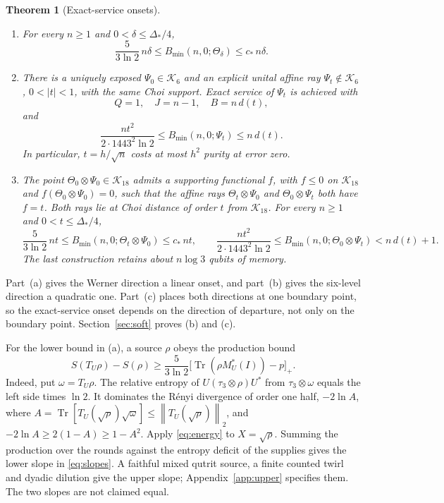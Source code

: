 \documentclass[11pt]{article}
\newtheorem{theorem}{Theorem}
\theoremstyle{definition}
\theoremstyle{remark}
\DeclareMathOperator{\Tr}{Tr}
\newcommand{\K}{\mathcal K}
\newcommand{\norm}[1]{\left\lVert#1\right\rVert}
\begin{document}
\begin{theorem}[Exact-service onsets]\label{thm:onsets}
\begin{enumerate}[label=(\alph*),itemsep=4pt]
\item For every $n\ge1$ and $0<\delta\le\Delta_*/4$,
\begin{equation}\label{eq:slopes}
 \frac{5}{3\ln2}\,n\delta\le B_{\min}(n,0;\Theta_\delta)\le c_*\,n\delta.
\end{equation}
\item There is a uniquely exposed $\Psi_0\in\K_6$ and an explicit unital affine ray $\Psi_t\notin\K_6$, $0<|t|<1$, with the same Choi support. Exact service of $\Psi_t$ is achieved with
\begin{equation}\label{eq:soft-ledger}
 Q=1,\quad J=n-1,\quad B=n\,d(t),
\end{equation}
and
\[
 \frac{nt^2}{2\cdot1443^2\ln2}\le B_{\min}(n,0;\Psi_t)\le n\,d(t).
\]
In particular, $t=h/\sqrt n$ costs at most $h^2$ purity at error zero.
\item The point $\Theta_0\otimes\Psi_0\in\K_{18}$ admits a supporting functional $f$, with $f\le0$ on $\K_{18}$ and $f(\Theta_0\otimes\Psi_0)=0$, such that the affine rays $\Theta_t\otimes\Psi_0$ and $\Theta_0\otimes\Psi_t$ both have $f=t$. Both rays lie at Choi distance of order $t$ from $\K_{18}$. For every $n\ge1$ and $0<t\le\Delta_*/4$,
\[
 \frac{5}{3\ln2}\,nt\le B_{\min}(n,0;\Theta_t\otimes\Psi_0)\le c_*\,nt,\qquad
 \frac{nt^2}{2\cdot1443^2\ln2}\le B_{\min}(n,0;\Theta_0\otimes\Psi_t)<n\,d(t)+1.
\]
The last construction retains about $n\log3$ qubits of memory.
\end{enumerate}
\end{theorem}

Part~(a) gives the Werner direction a linear onset, and part~(b) gives the six-level direction a quadratic one. Part~(c) places both directions at one boundary point, so the exact-service onset depends on the direction of departure, not only on the boundary point. Section~\ref{sec:soft} proves (b) and (c).

For the lower bound in (a), a source $\rho$ obeys the production bound
\begin{equation}\label{eq:production}
 S(T_U\rho)-S(\rho)\ge\frac{5}{3\ln2}
 \bigl[\Tr(\rho M_U^*(I))-p\bigr]_+.
\end{equation}
Indeed, put $\omega=T_U\rho$. The relative entropy of $U(\tau_3\otimes\rho)U^*$ from $\tau_3\otimes\omega$ equals the left side times $\ln2$. It dominates the R\'enyi divergence of order one half, $-2\ln A$, where $A=\Tr[T_U(\sqrt\rho)\sqrt\omega]\le\norm{T_U(\sqrt\rho)}_2$, and $-2\ln A\ge2(1-A)\ge1-A^2$. Apply \eqref{eq:energy} to $X=\sqrt\rho$. Summing the production over the rounds against the entropy deficit of the supplies gives the lower slope in \eqref{eq:slopes}. A faithful mixed qutrit source, a finite counted twirl and dyadic dilution give the upper slope; Appendix~\ref{app:upper} specifies them. The two slopes are not claimed equal.
\end{document}
